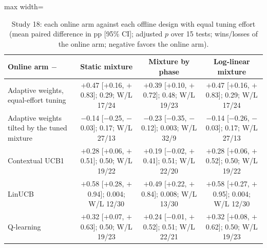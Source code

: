\begin{table}[t]
\caption{Study 18: each online arm against each offline design with equal tuning effort (mean paired difference in pp [95\% CI]; adjusted $p$ over 15 tests; wins/losses of the online arm; negative favors the online arm).}\label{tab:s18m}
\centering
\small
\begin{adjustbox}{max width=\linewidth}
\begin{tabular}{lccc}
\toprule
Online arm $-$ & Static mixture & Mixture by phase & Log-linear mixture \\
\midrule
Adaptive weights, equal-effort tuning & $+$0.47 [$+$0.16, $+$0.83]; 0.29; W/L 17/24 & $+$0.39 [$+$0.10, $+$0.72]; 0.48; W/L 19/23 & $+$0.47 [$+$0.16, $+$0.83]; 0.29; W/L 17/24 \\
Adaptive weights tilted by the tuned mixture & $-$0.14 [$-$0.25, $-$0.03]; 0.17; W/L 27/13 & $-$0.23 [$-$0.35, $-$0.12]; 0.003; W/L 32/9 & $-$0.14 [$-$0.26, $-$0.03]; 0.17; W/L 27/13 \\
Contextual UCB1 & $+$0.28 [$+$0.06, $+$0.51]; 0.50; W/L 19/22 & $+$0.19 [$-$0.02, $+$0.41]; 0.51; W/L 22/20 & $+$0.28 [$+$0.06, $+$0.52]; 0.50; W/L 19/22 \\
LinUCB & $+$0.58 [$+$0.28, $+$0.94]; 0.004; W/L 12/30 & $+$0.49 [$+$0.22, $+$0.84]; 0.008; W/L 13/30 & $+$0.58 [$+$0.27, $+$0.95]; 0.004; W/L 12/30 \\
Q-learning & $+$0.32 [$+$0.07, $+$0.63]; 0.50; W/L 19/23 & $+$0.24 [$-$0.01, $+$0.52]; 0.51; W/L 22/21 & $+$0.32 [$+$0.08, $+$0.62]; 0.50; W/L 19/23 \\
\bottomrule
\end{tabular}
\end{adjustbox}
\end{table}
